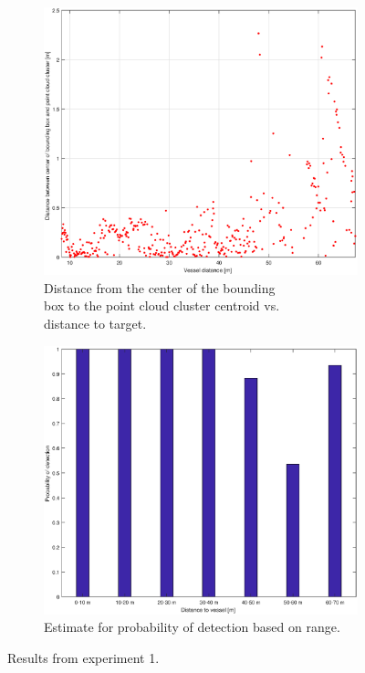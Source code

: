 \begin{figure}[htbp]
	\centering
	\begin{subfigure}[t]{.5\textwidth}
		\centering
		\includegraphics[width=\linewidth]{fig/exp_1_detect_dist.eps}
		\caption{Distance from the center of the bounding\\ box to the point cloud cluster centroid vs.\\ distance to target.}
		\label{fig:sub_ex1_detect_dist}
	\end{subfigure}%
	\begin{subfigure}[t]{.5\textwidth}
		\centering
		\includegraphics[width=\linewidth]{fig/exp_1_probs.eps}
		\caption{Estimate for probability of detection based on range.}
		\label{fig:sub_ex1_prob}
	\end{subfigure}
	\caption{Results from experiment 1.}
	\label{fig:ex1_plot}
\end{figure}
